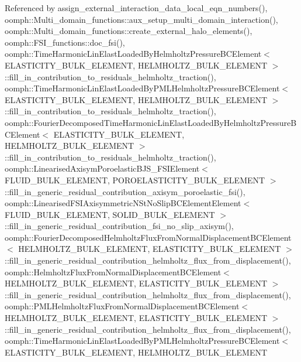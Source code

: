 Referenced by assign\+\_\+external\+\_\+interaction\+\_\+data\+\_\+local\+\_\+eqn\+\_\+numbers(), oomph\+::\+Multi\+\_\+domain\+\_\+functions\+::aux\+\_\+setup\+\_\+multi\+\_\+domain\+\_\+interaction(), oomph\+::\+Multi\+\_\+domain\+\_\+functions\+::create\+\_\+external\+\_\+halo\+\_\+elements(), oomph\+::\+F\+S\+I\+\_\+functions\+::doc\+\_\+fsi(), oomph\+::\+Time\+Harmonic\+Lin\+Elast\+Loaded\+By\+Helmholtz\+Pressure\+B\+C\+Element$<$ E\+L\+A\+S\+T\+I\+C\+I\+T\+Y\+\_\+\+B\+U\+L\+K\+\_\+\+E\+L\+E\+M\+E\+N\+T, H\+E\+L\+M\+H\+O\+L\+T\+Z\+\_\+\+B\+U\+L\+K\+\_\+\+E\+L\+E\+M\+E\+N\+T $>$\+::fill\+\_\+in\+\_\+contribution\+\_\+to\+\_\+residuals\+\_\+helmholtz\+\_\+traction(), oomph\+::\+Time\+Harmonic\+Lin\+Elast\+Loaded\+By\+P\+M\+L\+Helmholtz\+Pressure\+B\+C\+Element$<$ E\+L\+A\+S\+T\+I\+C\+I\+T\+Y\+\_\+\+B\+U\+L\+K\+\_\+\+E\+L\+E\+M\+E\+N\+T, H\+E\+L\+M\+H\+O\+L\+T\+Z\+\_\+\+B\+U\+L\+K\+\_\+\+E\+L\+E\+M\+E\+N\+T $>$\+::fill\+\_\+in\+\_\+contribution\+\_\+to\+\_\+residuals\+\_\+helmholtz\+\_\+traction(), oomph\+::\+Fourier\+Decomposed\+Time\+Harmonic\+Lin\+Elast\+Loaded\+By\+Helmholtz\+Pressure\+B\+C\+Element$<$ E\+L\+A\+S\+T\+I\+C\+I\+T\+Y\+\_\+\+B\+U\+L\+K\+\_\+\+E\+L\+E\+M\+E\+N\+T, H\+E\+L\+M\+H\+O\+L\+T\+Z\+\_\+\+B\+U\+L\+K\+\_\+\+E\+L\+E\+M\+E\+N\+T $>$\+::fill\+\_\+in\+\_\+contribution\+\_\+to\+\_\+residuals\+\_\+helmholtz\+\_\+traction(), oomph\+::\+Linearised\+Axisym\+Poroelastic\+B\+J\+S\+\_\+\+F\+S\+I\+Element$<$ F\+L\+U\+I\+D\+\_\+\+B\+U\+L\+K\+\_\+\+E\+L\+E\+M\+E\+N\+T, P\+O\+R\+O\+E\+L\+A\+S\+T\+I\+C\+I\+T\+Y\+\_\+\+B\+U\+L\+K\+\_\+\+E\+L\+E\+M\+E\+N\+T $>$\+::fill\+\_\+in\+\_\+generic\+\_\+residual\+\_\+contribution\+\_\+axisym\+\_\+poroelastic\+\_\+fsi(), oomph\+::\+Linearised\+F\+S\+I\+Axisymmetric\+N\+St\+No\+Slip\+B\+C\+Element\+Element$<$ F\+L\+U\+I\+D\+\_\+\+B\+U\+L\+K\+\_\+\+E\+L\+E\+M\+E\+N\+T, S\+O\+L\+I\+D\+\_\+\+B\+U\+L\+K\+\_\+\+E\+L\+E\+M\+E\+N\+T $>$\+::fill\+\_\+in\+\_\+generic\+\_\+residual\+\_\+contribution\+\_\+fsi\+\_\+no\+\_\+slip\+\_\+axisym(), oomph\+::\+Fourier\+Decomposed\+Helmholtz\+Flux\+From\+Normal\+Displacement\+B\+C\+Element$<$ H\+E\+L\+M\+H\+O\+L\+T\+Z\+\_\+\+B\+U\+L\+K\+\_\+\+E\+L\+E\+M\+E\+N\+T, E\+L\+A\+S\+T\+I\+C\+I\+T\+Y\+\_\+\+B\+U\+L\+K\+\_\+\+E\+L\+E\+M\+E\+N\+T $>$\+::fill\+\_\+in\+\_\+generic\+\_\+residual\+\_\+contribution\+\_\+helmholtz\+\_\+flux\+\_\+from\+\_\+displacement(), oomph\+::\+Helmholtz\+Flux\+From\+Normal\+Displacement\+B\+C\+Element$<$ H\+E\+L\+M\+H\+O\+L\+T\+Z\+\_\+\+B\+U\+L\+K\+\_\+\+E\+L\+E\+M\+E\+N\+T, E\+L\+A\+S\+T\+I\+C\+I\+T\+Y\+\_\+\+B\+U\+L\+K\+\_\+\+E\+L\+E\+M\+E\+N\+T $>$\+::fill\+\_\+in\+\_\+generic\+\_\+residual\+\_\+contribution\+\_\+helmholtz\+\_\+flux\+\_\+from\+\_\+displacement(), oomph\+::\+P\+M\+L\+Helmholtz\+Flux\+From\+Normal\+Displacement\+B\+C\+Element$<$ H\+E\+L\+M\+H\+O\+L\+T\+Z\+\_\+\+B\+U\+L\+K\+\_\+\+E\+L\+E\+M\+E\+N\+T, E\+L\+A\+S\+T\+I\+C\+I\+T\+Y\+\_\+\+B\+U\+L\+K\+\_\+\+E\+L\+E\+M\+E\+N\+T $>$\+::fill\+\_\+in\+\_\+generic\+\_\+residual\+\_\+contribution\+\_\+helmholtz\+\_\+flux\+\_\+from\+\_\+displacement(), oomph\+::\+Time\+Harmonic\+Lin\+Elast\+Loaded\+By\+P\+M\+L\+Helmholtz\+Pressure\+B\+C\+Element$<$ E\+L\+A\+S\+T\+I\+C\+I\+T\+Y\+\_\+\+B\+U\+L\+K\+\_\+\+E\+L\+E\+M\+E\+N\+T, H\+E\+L\+M\+H\+O\+L\+T\+Z\+\_\+\+B\+U\+L\+K\+\_\+\+E\+L\+E\+M\+E\+N\+T 